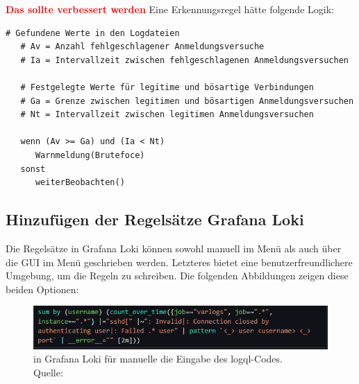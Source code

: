 
\textbf{\textcolor{red}{Das sollte verbessert werden}}
Eine Erkennungsregel hätte folgende Logik:
{
\begin{Verbatim}[frame=single]
   # Gefundene Werte in den Logdateien
   # Av = Anzahl fehlgeschlagener Anmeldungsversuche
   # Ia = Intervallzeit zwischen fehlgeschlagenen Anmeldungsversuchen

   # Festgelegte Werte für legitime und bösartige Verbindungen
   # Ga = Grenze zwischen legitimen und bösartigen Anmeldungsversuchen
   # Nt = Intervallzeit zwischen legitimen Anmeldungsversuchen

   wenn (Av >= Ga) und (Ia < Nt)
      Warnmeldung(Brutefoce)
   sonst
      weiterBeobachten()
\end{Verbatim}
}


\subsection{Hinzufügen der Regelsätze Grafana Loki}

Die Regelsätze in Grafana Loki können sowohl manuell im Menü  als auch über die \gls{GUI} im Menü  geschrieben werden. Letzteres bietet eine benutzerfreundlichere Umgebung, um die Regeln zu schreiben. Die folgenden Abbildungen zeigen diese beiden Optionen:

\begin{figure}[H]
   \centering
   \includegraphics[width=1\textwidth]{assets/manuellerCodeLoki.png}
   \caption[ in Grafana Loki für manuelle die Eingabe des \gls{logql}-Codes]
   { in Grafana Loki für manuelle die Eingabe des \gls{logql}-Codes. \\ Quelle: \citep{VoidQuark_sshlogs}}
   \centering
\end{figure}

